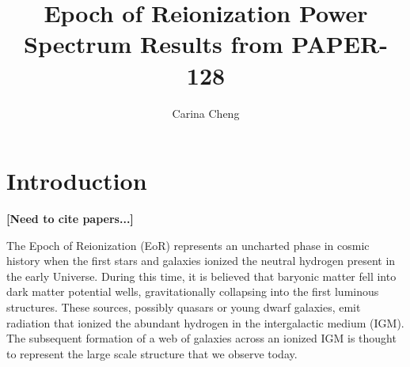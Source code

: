 \documentclass[preprint2,numberedappendix,tighten,twocolappendix]{aastex6}  %
\newcommand{\cc}[1]{{\color{purple} \textbf{[#1]}}}
\begin{document}
\title{Epoch of Reionization Power Spectrum Results from PAPER-128}

\author{
Carina Cheng
}


	






\begin{abstract}
\end{abstract}


\section{Introduction}
\label{sec:Intro}

\cc{Need to cite papers...}

The Epoch of Reionization (EoR) represents an uncharted phase in cosmic history when the first stars and galaxies ionized the neutral hydrogen present in the early Universe. During this time, it is believed that baryonic matter fell into dark matter potential wells, gravitationally collapsing into the first luminous structures. These sources, possibly quasars or young dwarf galaxies, emit radiation that ionized the abundant hydrogen in the intergalactic medium (IGM). The subsequent formation of a web of galaxies across an ionized IGM is thought to represent the large scale structure that we observe today.
\end{document}
